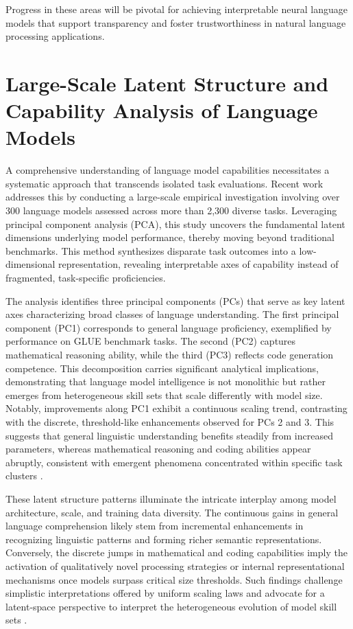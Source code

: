 Progress in these areas will be pivotal for achieving interpretable neural language models that support transparency and foster trustworthiness in natural language processing applications.

\section{Large-Scale Latent Structure and Capability Analysis of Language Models}

A comprehensive understanding of language model capabilities necessitates a systematic approach that transcends isolated task evaluations. Recent work \cite{ref45} addresses this by conducting a large-scale empirical investigation involving over 300 language models assessed across more than 2,300 diverse tasks. Leveraging principal component analysis (PCA), this study uncovers the fundamental latent dimensions underlying model performance, thereby moving beyond traditional benchmarks. This method synthesizes disparate task outcomes into a low-dimensional representation, revealing interpretable axes of capability instead of fragmented, task-specific proficiencies.

The analysis identifies three principal components (PCs) that serve as key latent axes characterizing broad classes of language understanding. The first principal component (PC1) corresponds to general language proficiency, exemplified by performance on GLUE benchmark tasks. The second (PC2) captures mathematical reasoning ability, while the third (PC3) reflects code generation competence. This decomposition carries significant analytical implications, demonstrating that language model intelligence is not monolithic but rather emerges from heterogeneous skill sets that scale differently with model size. Notably, improvements along PC1 exhibit a continuous scaling trend, contrasting with the discrete, threshold-like enhancements observed for PCs 2 and 3. This suggests that general linguistic understanding benefits steadily from increased parameters, whereas mathematical reasoning and coding abilities appear abruptly, consistent with emergent phenomena concentrated within specific task clusters \cite{ref45}.

These latent structure patterns illuminate the intricate interplay among model architecture, scale, and training data diversity. The continuous gains in general language comprehension likely stem from incremental enhancements in recognizing linguistic patterns and forming richer semantic representations. Conversely, the discrete jumps in mathematical and coding capabilities imply the activation of qualitatively novel processing strategies or internal representational mechanisms once models surpass critical size thresholds. Such findings challenge simplistic interpretations offered by uniform scaling laws and advocate for a latent-space perspective to interpret the heterogeneous evolution of model skill sets \cite{ref45}.

